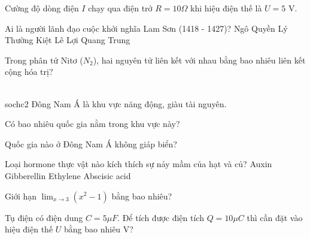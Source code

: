 \begin{ex}
    Cường độ dòng điện $I$ chạy qua điện trở $R = 10 \Omega$ khi hiệu điện thế là $U = 5$ V.
\end{ex}

\begin{ex}
    Ai là người lãnh đạo cuộc khởi nghĩa Lam Sơn (1418 - 1427)?
    \choice
    {Ngô Quyền}
    {Lý Thường Kiệt}
    {\True Lê Lợi}
    {Quang Trung}
\end{ex}

\begin{ex}
    Trong phân tử Nitơ ($N_2$), hai nguyên tử liên kết với nhau bằng bao nhiêu liên kết cộng hóa trị?
\end{ex}

\begin{ex}
    \\sochc{2}{
        Đông Nam Á là khu vực năng động, giàu tài nguyên.
    }
    \begin{chc}
        Có bao nhiêu quốc gia nằm trong khu vực này?
    \end{chc}
    \begin{chc}
        Quốc gia nào ở Đông Nam Á không giáp biển?
    \end{chc}
\end{ex}

\begin{ex}
    Loại hormone thực vật nào kích thích sự nảy mầm của hạt và củ?
    \choice
    {Auxin}
    {\True Gibberellin}
    {Ethylene}
    {Abscisic acid}
\end{ex}

\begin{ex}
    Giới hạn $\lim_{x \to 3} (x^2 - 1)$ bằng bao nhiêu?
\end{ex}

\begin{ex}
    Tụ điện có điện dung $C = 5 \mu F$. Để tích được điện tích $Q = 10 \mu C$ thì cần đặt vào hiệu điện thế $U$ bằng bao nhiêu V?
\end{ex}

